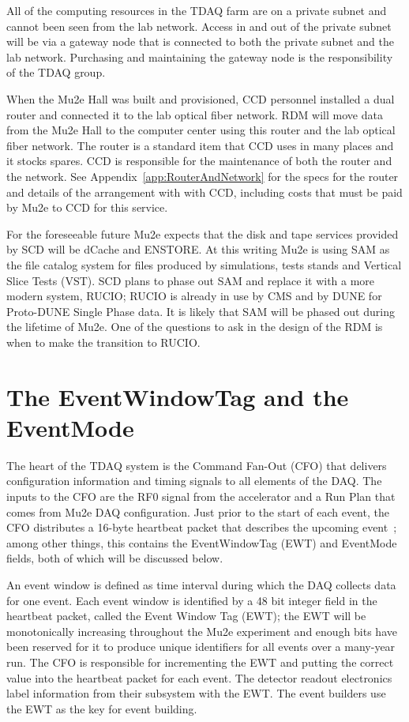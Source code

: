 All of the computing resources in the TDAQ farm are on a private subnet
and cannot been seen from the lab network.  Access in and out
of the private subnet will be via a gateway node that is connected to
both the private subnet and the lab network.
Purchasing and maintaining the gateway node is the responsibility of the TDAQ group.

When the Mu2e Hall was built and provisioned, CCD personnel installed a dual router
and connected it to the lab optical fiber network.
RDM will move data from the Mu2e Hall
to the computer center using this router and the lab optical fiber network.
The router is a standard item that CCD uses in many places and it stocks spares.
CCD is responsible for the maintenance of both the router and the network.
See Appendix~\ref{app:RouterAndNetwork} for the
specs for the router and details of the arrangement with with CCD,
including costs that must be paid by Mu2e to CCD for this service.


For the foreseeable future Mu2e expects that the disk and tape services provided
by SCD will be dCache and ENSTORE.
At this writing Mu2e is using SAM as the file catalog system for files produced
by simulations, tests stands and Vertical Slice Tests (VST).
SCD plans to phase out SAM and replace it with a more modern system, RUCIO\cite{RUCIOHome};
RUCIO is already in use by CMS and by DUNE for Proto-DUNE Single Phase data.
It is likely that SAM will be phased out during the lifetime of Mu2e.
One of the questions to ask in the design of the RDM is
when to make the transition to RUCIO.

\section{The EventWindowTag and the EventMode}
\label{sec:EWTagAndEventMode}

The heart of the TDAQ system is the Command Fan-Out (CFO) that delivers
configuration information and timing signals to all elements of the DAQ.
The inputs to the CFO are the RF0 signal from the accelerator
and a Run Plan that comes from Mu2e DAQ configuration.
Just prior to the start of each event,
the CFO distributes a 16-byte heartbeat packet that describes the upcoming event~\cite{PacketProtocols};
among other things, this contains the EventWindowTag (EWT) and EventMode fields,
both of which will be discussed below.

An event window is defined as time interval during which the DAQ collects data for one event.
Each event window is identified by a 48 bit integer field in the heartbeat packet, called
the Event Window Tag (EWT);
the EWT will be monotonically increasing throughout the Mu2e experiment and
enough bits have been reserved for it to produce unique identifiers for all
events over a many-year run.
The CFO is responsible for incrementing the EWT and putting the correct value into
the heartbeat packet for each event.
The detector readout electronics label information from their subsystem with the EWT.
The event builders use the EWT as the key for event building.

